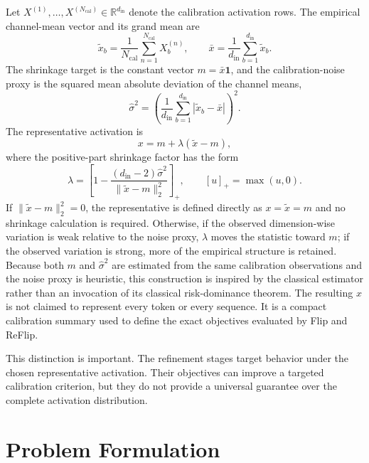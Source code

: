Let $X^{(1)},\ldots,X^{(N_{\mathrm{cal}})}\in\mathbb{R}^{d_{\mathrm{in}}}$ denote the calibration activation rows. The empirical channel-mean vector and its grand mean are
\begin{equation}
\tilde{x}_b=\frac{1}{N_{\mathrm{cal}}}\sum_{n=1}^{N_{\mathrm{cal}}}X_b^{(n)},
\qquad
\bar{x}=\frac{1}{d_{\mathrm{in}}}\sum_{b=1}^{d_{\mathrm{in}}}\tilde{x}_b.
\end{equation}
The shrinkage target is the constant vector $m=\bar{x}\mathbf{1}$, and the calibration-noise proxy is the squared mean absolute deviation of the channel means,
\begin{equation}
\hat{\sigma}^2=
\left(
\frac{1}{d_{\mathrm{in}}}
\sum_{b=1}^{d_{\mathrm{in}}}
\left|\tilde{x}_b-\bar{x}\right|
\right)^2.
\end{equation}
The representative activation is
\begin{equation}
x=m+\lambda(\tilde{x}-m),
\end{equation}
where the positive-part shrinkage factor has the form
\begin{equation}
\lambda=
\left[
1-\frac{(d_{\mathrm{in}}-2)\hat{\sigma}^{2}}
{\|\tilde{x}-m\|_2^2}
\right]_+,
\qquad [u]_+=\max(u,0).
\end{equation}
If $\|\tilde{x}-m\|_2^2=0$, the representative is defined directly as $x=\tilde{x}=m$ and no shrinkage calculation is required. Otherwise, if the observed dimension-wise variation is weak relative to the noise proxy, $\lambda$ moves the statistic toward $m$; if the observed variation is strong, more of the empirical structure is retained. Because both $m$ and $\hat{\sigma}^2$ are estimated from the same calibration observations and the noise proxy is heuristic, this construction is inspired by the classical estimator rather than an invocation of its classical risk-dominance theorem. The resulting $x$ is not claimed to represent every token or every sequence. It is a compact calibration summary used to define the exact objectives evaluated by Flip and ReFlip.

This distinction is important. The refinement stages target behavior under the chosen representative activation. Their objectives can improve a targeted calibration criterion, but they do not provide a universal guarantee over the complete activation distribution.

\section{Problem Formulation}

